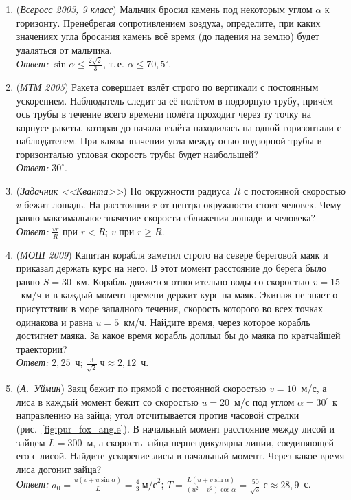 \documentclass[../main.tex]{subfiles}
\begin{document}
\begin{enumerate}
  \item (\textit{Всеросс 2003, 9 класс}) Мальчик бросил камень под некоторым углом
  $\alpha$ к горизонту. Пренебрегая сопротивлением воздуха, определите, при каких
  значениях угла бросания камень всё время (до падения на землю) будет удаляться от
  мальчика.\\
  \textit{Ответ:} $\sin\alpha \leq \frac{2\sqrt{2}}{3}$, т.\,е. $\alpha \leq 70{,}5^\circ$.

  \item (\textit{МТМ 2005}) Ракета совершает взлёт строго по вертикали с постоянным
  ускорением. Наблюдатель следит за её полётом в подзорную трубу, причём ось трубы в
  течение всего времени полёта проходит через ту точку на корпусе ракеты, которая до
  начала взлёта находилась на одной горизонтали с наблюдателем. При каком значении
  угла между осью подзорной трубы и горизонталью угловая скорость трубы будет
  наибольшей?\\
  \textit{Ответ:} $30^\circ$.

  \item (\textit{Задачник <<Кванта>>}) По окружности радиуса $R$ с постоянной скоростью
  $v$ бежит лошадь. На расстоянии $r$ от центра окружности стоит человек. Чему равно
  максимальное значение скорости сближения лошади и человека?\\
  \textit{Ответ:} $\frac{vr}{R}$ при $r < R$; $v$ при $r \geq R$.

  \item (\textit{МОШ 2009}) Капитан корабля заметил строго на севере береговой маяк и
  приказал держать курс на него. В этот момент расстояние до берега было равно
  $S = 30$~км. Корабль движется относительно воды со скоростью $v = 15$~км/ч и в каждый
  момент времени держит курс на маяк. Экипаж не знает о присутствии в море западного
  течения, скорость которого во всех точках одинакова и равна $u = 5$~км/ч. Найдите
  время, через которое корабль достигнет маяка. За какое время корабль доплыл бы до
  маяка по кратчайшей траектории?\\
  \textit{Ответ:} $2{,}25$~ч; $\frac{3}{\sqrt{2}}~\text{ч} \approx 2{,}12$~ч.

  \item (\textit{А.~Уймин}) Заяц бежит по прямой с постоянной скоростью $v = 10$~м/с, а
  лиса в каждый момент бежит со скоростью $u = 20$~м/с под углом $\alpha = 30^\circ$ к
  направлению на зайца; угол отсчитывается против часовой стрелки
  (рис.~\ref{fig:pur_fox_angle}). В начальный момент расстояние между лисой и зайцем
  $L = 300$~м, а скорость зайца перпендикулярна линии, соединяющей его с лисой.
  Найдите ускорение лисы в начальный момент. Через какое время лиса догонит зайца?\\
  \textit{Ответ:} $a_0 = \frac{u(v + u\sin\alpha)}{L} = \frac{4}{3}~\text{м/с}^2$;
  $T = \frac{L(u + v\sin\alpha)}{(u^2 - v^2)\cos\alpha} = \frac{50}{\sqrt{3}}~\text{с}
  \approx 28{,}9$~с.


\end{enumerate}
\end{document}

